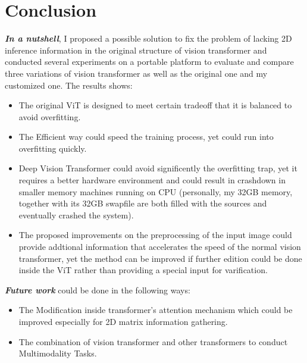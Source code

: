 \section{Conclusion}
\textbf{\textit{In a nutshell}}, I proposed a possible solution to fix the problem of lacking 2D inference information in the original structure of vision transformer and conducted several experiments on a portable platform to evaluate and compare three variations of vision transformer as well as the original one and my customized one. The results shows:
\begin{itemize}
\item The original ViT is designed to meet certain tradeoff that it is balanced to avoid overfitting.
\item The Efficient way could speed the training process, yet could run into overfitting quickly.
\item Deep Vision Transformer could avoid significently the overfitting trap, yet it requires a better hardware environment and could result in crashdown in smaller memory machines running on CPU (personally, my 32GB memory, together with its 32GB swapfile are both filled with the sources and eventually crashed the system).
\item The proposed improvements on the preprocessing of the input image could provide addtional information that accelerates the speed of the normal vision transformer, yet the method can be improved if further edition could be done inside the ViT rather than providing a special input for varification.
\end{itemize}

\textbf{\textit{Future work}} could be done in the following ways:
\begin{itemize}
\item The Modification inside transformer's attention mechanism which could be improved especially for 2D matrix information gathering.

\item The combination of vision transformer and other transformers to conduct Multimodality Tasks.
 
  
\end{itemize}
